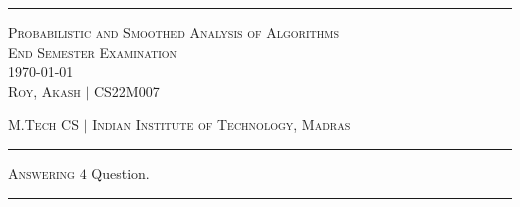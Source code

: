 \documentclass[12pt, a4paper, onecolumn]{exam}
\begin{document}
\hrule
\vspace{1em}


\begingroup
\centering
\large \textsc{Probabilistic and Smoothed Analysis of Algorithms}\\
\large \textsc{End Semester Examination}\\[0.5em]
\large \today\\[0.5em]
\large \textsc{Roy, Akash} $\mid$ CS22M007\par
\large \textsc{M.Tech CS} $\mid$ \textsc{Indian Institute of Technology, Madras}\par
\endgroup
\pointsdroppedatright %
\printanswers
\renewcommand{\solutiontitle}{\noindent\textbf{Ans:}\enspace}   %

\vspace{1em}
\hrule
\vspace{0.2em}

\begin{center}
	\textsc{Answering} $4$ Question.
\end{center}

\vspace{0.2em}
\hrule
\vspace{1em}
\end{document}

